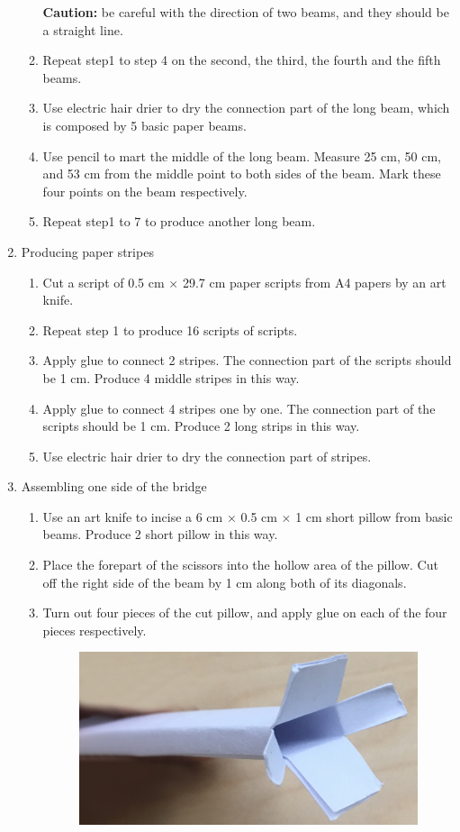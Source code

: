 \begin{enumerate}
\begin{enumerate}
	\textbf{Caution:} be careful with the direction of two beams, and they should be a straight line. 
	\item Repeat step1 to step 4 on the second, the third, the fourth and the fifth beams. 
	\item Use electric hair drier to dry the connection part of the long beam, which is composed by 5 basic paper beams. 
	\item Use pencil to mart the middle of the long beam. Measure 25 cm, 50 cm, and 53 cm from the middle point to both sides of the beam. Mark these four points on the beam respectively. 
	\item Repeat step1 to 7 to produce another long beam. 
	\end{enumerate}
\item Producing paper stripes
	\begin{enumerate}
	\item Cut a script of 0.5 cm $\times$ 29.7 cm paper scripts from A4 papers by an art knife. 
	\item Repeat step 1 to produce 16 scripts of scripts.
	\item Apply glue to connect 2 stripes. The connection part of the scripts should be 1 cm. Produce 4 middle stripes in this way.
	\item Apply glue to connect 4 stripes one by one. The connection part of the scripts should be 1 cm. Produce 2 long strips in this way.
	\item Use electric hair drier to dry the connection part of stripes.
	\end{enumerate}
\item Assembling one side of the bridge
	\begin{enumerate}
	\item Use an art knife to incise a 6 cm $\times$ 0.5 cm $\times$ 1 cm short pillow from basic beams. Produce 2 short pillow in this way. 
	\item Place the forepart of the scissors into the hollow area of the pillow. Cut off the right side of the beam by 1 cm along both of its diagonals.
	\item Turn out four pieces of the cut pillow, and apply glue on each of the four pieces respectively.
	\begin{figure}[H]
	\begin{center}
	\includegraphics[width=10cm]{figure/procedureBridge/p1}

\end{center}
\end{figure}
\end{enumerate}
\end{enumerate}
